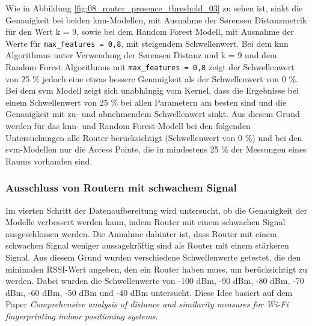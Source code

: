 Wie in Abbildung \ref{fig:08_router_presence_threshold_03} zu sehen ist, sinkt die Genauigkeit bei beiden \gls{knn}-Modellen, mit Ausnahme der Sørensen Distanzmetrik für den Wert k = 9, sowie bei dem Random Forest Modell, mit Ausnahme der Werte für \texttt{max\_features = 0,8}, mit steigendem Schwellenwert. Bei dem \gls{knn} Algorithmus unter Verwendung der Sørensen Distanz und k = 9 und dem Random Forest Algorithmus mit \texttt{max\_features = 0,8} zeigt der Schwellenwert von 25 \% jedoch eine etwas bessere Genauigkeit als der Schwellenwert von 0 \%. Bei dem \gls{svm} Modell zeigt sich unabhängig vom Kernel, dass die Ergebnisse bei einem Schwellenwert von 25 \% bei allen Parametern am besten sind und die Genauigkeit mit zu- und abnehmendem Schwellenwert sinkt. Aus diesem Grund werden für das \gls{knn}- und Random Forest-Modell bei den folgenden Untersuchungen alle Router berücksichtigt (Schwellenwert von 0 \%) und bei den \gls{svm}-Modellen nur die Access Points, die in mindestens 25 \% der Messungen eines Raums vorhanden sind.

\subsubsection{Ausschluss von Routern mit schwachem Signal}

Im vierten Schritt der Datenaufbereitung wird untersucht, ob die Genauigkeit der Modelle verbessert werden kann, indem Router mit einem schwachen Signal ausgeschlossen werden. Die Annahme dahinter ist, dass Router mit einem schwachen Signal weniger aussagekräftig sind als Router mit einem stärkeren Signal. Aus diesem Grund wurden verschiedene Schwellenwerte getestet, die den minimalen RSSI-Wert angeben, den ein Router haben muss, um berücksichtigt zu werden. Dabei wurden die Schwellenwerte von -100 dBm, -90 dBm, -80 dBm, -70 dBm, -60 dBm, -50 dBm und -40 dBm untersucht. Diese Idee basiert auf dem Paper \textit{Comprehensive analysis of distance and similarity measures for Wi-Fi fingerprinting indoor positioning systems}.


